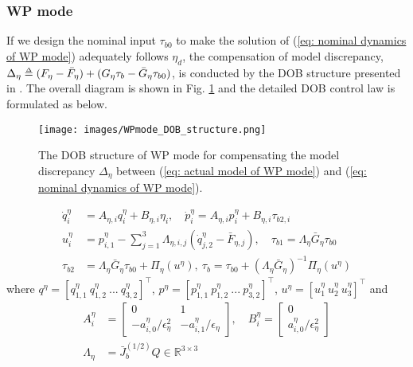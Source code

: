 \documentclass[letterpaper, 10 pt, conference]{ieeeconf}  %
\def\delequal{\mathrel{\ensurestackMath{\stackon[1pt]{=}{\scriptscriptstyle\Delta}}}}
\theoremstyle{definition}
\begin{document}
\subsubsection{WP mode}
If we design the nominal input $\tau_{b 0}$ to make the solution of (\ref{eq: nominal dynamics of WP mode}) adequately follows $\eta_d$, the compensation of model discrepancy,  $\Delta_{\eta} \delequal (F_{\eta} - \bar{F}_{\eta}) + (G_{\eta} \tau_b - \bar{G}_{\eta} \tau_{b 0})$, is conducted by the DOB structure presented in \cite{back2009inner}. The overall diagram is shown in Fig. {\ref{fig: WPmode_DOB_structure}} and the detailed DOB control law is formulated as below.
\begin{figure}[t]
\centering
\texttt{[image: images/WPmode\_DOB\_structure.png]}
\caption{The DOB structure of WP mode for compensating the model discrepancy $\Delta_{\eta}$ between (\ref{eq: actual model of WP mode}) and (\ref{eq: nominal dynamics of WP mode}).} \label{fig: WPmode_DOB_structure}
\vspace{-0.5cm}
\end{figure}
\begin{equation} \label{nominal controller for wire-pulling mode}
\begin{split}
    \dot{q}^{\eta}_{i} &= A_{\eta, i}q^{\eta}_{i} + B_{\eta, i}\eta_{i}, \quad \dot{p}^{\eta}_{i} = A_{\eta, i}p^{\eta}_{i} + B_{\eta, i}\tau_{b2, i} \\
    u^{\eta}_i &= p^{\eta}_{i, 1} - \sum_{j = 1}^{3}\Lambda_{\eta, i, j}(\dot{q}^{\eta}_{j, 2}-\bar{F}_{\eta, j}), \quad \tau_{b1} = \Lambda_{\eta}\bar{G}_{\eta}\tau_{b0} \\ 
    \tau_{b2} &= \Lambda_{\eta}\bar{G}_{\eta}\tau_{b 0} + \Pi_{\eta}(u^{\eta}), \ \tau_b = \tau_{b 0} + (\Lambda_{\eta}\bar{G}_{\eta})^{-1}\Pi_{\eta}(u^{\eta})
\end{split}
\end{equation}
where $q^{\eta} = [q^{\eta}_{1,1} \ q^{\eta}_{1,2} \ ...\ q^{\eta}_{3,2}]^{\top}$, $p^{\eta} = [p^{\eta}_{1,1} \ p^{\eta}_{1,2} \ ...\ p^{\eta}_{3,2}]^{\top}$, $u^{\eta} = [u^{\eta}_1 \ u^{\eta}_2 \ u^{\eta}_3]^{\top}$ and
\begin{equation*}
\begin{split}
    A^{\eta}_i &= 
    \begin{bmatrix}
        0 & 1 \\
        -a^{\eta}_{i, 0}/{\epsilon}^2_{\eta} & -a^{\eta}_{i, 1}/\epsilon_{\eta}
    \end{bmatrix}, \quad B^{\eta}_i = 
    \begin{bmatrix}
         0 \\
        a^{\eta}_{i, 0}/\epsilon_{\eta}^2
    \end{bmatrix}\\
\Lambda_{\eta} &= \bar{J}_b^{(1/2)} Q \in \mathbb{R}^{3 \times 3}
\end{split}
\end{equation*}
\end{document}
